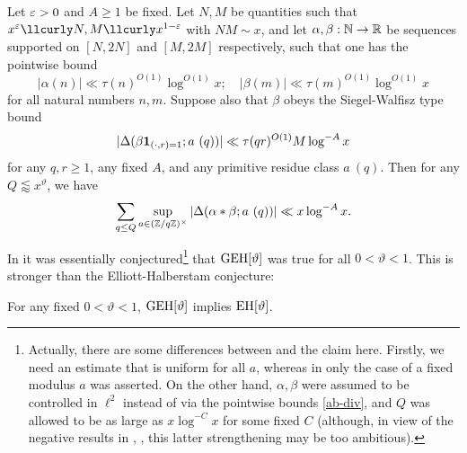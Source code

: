 \begin{claim}\label{geh-def}  Let $\varepsilon > 0$ and $A \geq 1$ be fixed.  Let $N,M$ be quantities such that
$x^\eps \lessapprox N,M \lessapprox x^{1-\eps}$ with $NM \sim x$, and let $\alpha, \beta: \mathbb{N} \to \mathbb{R}$ be sequences supported on $[N,2N]$ and $[M,2M]$ respectively, such that one has the pointwise bound
\begin{equation}\label{ab-div}
 |\alpha(n)| \ll \tau(n)^{O(1)} \log^{O(1)} x; \quad |\beta(m)| \ll \tau(m)^{O(1)} \log^{O(1)} x
\end{equation}
for all natural numbers $n,m$.  Suppose also that $\beta$ obeys the Siegel-Walfisz type bound
\begin{equation}\label{sig}
| \Delta(\beta \mathbf{1}_{(\cdot,r)=1}; a\ (q)) | \ll \tau(qr)^{O(1)} M \log^{-A} x 
\end{equation}
for any $q,r \geq 1$, any fixed $A$, and any primitive residue class $a\ (q)$.  Then for any $Q \lessapprox x^\vartheta$, we have
\begin{equation}\label{qq-gen}
 \sum_{q \leq Q} \sup_{a \in (\mathbb{Z}/q\mathbb{Z})^\times} |\Delta(\alpha \ast \beta; a\ (q))| \ll x \log^{-A} x.
\end{equation} 
\end{claim}

In \cite[Conjecture 1]{bfi} it was essentially conjectured\footnote{Actually, there are some differences between \cite[Conjecture 1]{bfi} and the claim here.  Firstly, we need an estimate that is uniform for all $a$, whereas in \cite{bfi} only the case of a fixed modulus $a$ was asserted.  On the other hand, $\alpha,\beta$ were assumed to be controlled in $\ell^2$ instead of via the pointwise bounds \eqref{ab-div}, and $Q$ was allowed to be as large as $x \log^{-C} x$ for some fixed $C$ (although, in view of the negative results in \cite{fg}, \cite{fghm}, this latter strengthening may be too ambitious).} that $\operatorname*{GEH}[\vartheta]$ was true for all $0 < \vartheta < 1$.   This is stronger than the Elliott-Halberstam conjecture:

\begin{proposition}\label{geh-eh}  For any fixed $0 < \vartheta < 1$, $\operatorname*{GEH}[\vartheta]$ implies $\operatorname*{EH}[\vartheta]$.
\end{proposition}

